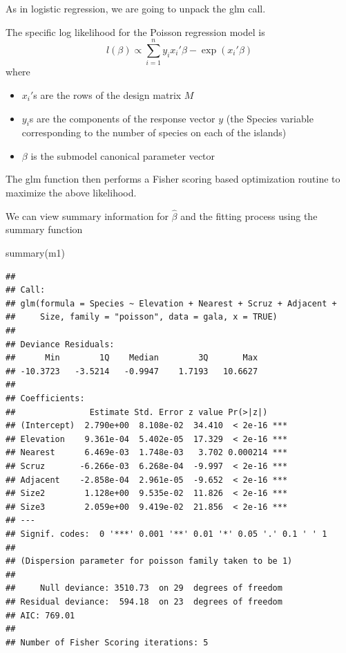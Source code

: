 \documentclass[
  ignorenonframetext,
]{beamer}
\newenvironment{Shaded}{\begin{snugshade}}{\end{snugshade}}
\newcommand{\FunctionTok}[1]{\textcolor[rgb]{0.00,0.00,0.00}{#1}}
\newcommand{\NormalTok}[1]{#1}
\providecommand{\tightlist}{%
  \setlength{\itemsep}{0pt}\setlength{\parskip}{0pt}}
\begin{document}
\begin{frame}{}
\protect\hypertarget{section-4}{}
As in logistic regression, we are going to unpack the glm call.

\vspace{12pt}

The specific log likelihood for the Poisson regression model is \[
  l(\beta) \propto \sum_{i=1}^n y_ix_i'\beta - \exp\left(x_i'\beta\right)
\] where

\begin{itemize}
\tightlist
\item
  \(x_i'\)s are the rows of the design matrix \(M\)
\item
  \(y_i\)s are the components of the response vector \(y\) (the Species
  variable corresponding to the number of species on each of the
  islands)
\item
  \(\beta\) is the submodel canonical parameter vector
\end{itemize}

\vspace{12pt}

The glm function then performs a Fisher scoring based optimization
routine to maximize the above likelihood.
\end{frame}

\begin{frame}[fragile]{}
\protect\hypertarget{section-5}{}
We can view summary information for \(\hat\beta\) and the fitting
process using the summary function

\tiny

\begin{Shaded}
\begin{Highlighting}[]
\FunctionTok{summary}\NormalTok{(m1)}
\end{Highlighting}
\end{Shaded}

\begin{verbatim}
## 
## Call:
## glm(formula = Species ~ Elevation + Nearest + Scruz + Adjacent + 
##     Size, family = "poisson", data = gala, x = TRUE)
## 
## Deviance Residuals: 
##      Min        1Q    Median        3Q       Max  
## -10.3723   -3.5214   -0.9947    1.7193   10.6627  
## 
## Coefficients:
##               Estimate Std. Error z value Pr(>|z|)    
## (Intercept)  2.790e+00  8.108e-02  34.410  < 2e-16 ***
## Elevation    9.361e-04  5.402e-05  17.329  < 2e-16 ***
## Nearest      6.469e-03  1.748e-03   3.702 0.000214 ***
## Scruz       -6.266e-03  6.268e-04  -9.997  < 2e-16 ***
## Adjacent    -2.858e-04  2.961e-05  -9.652  < 2e-16 ***
## Size2        1.128e+00  9.535e-02  11.826  < 2e-16 ***
## Size3        2.059e+00  9.419e-02  21.856  < 2e-16 ***
## ---
## Signif. codes:  0 '***' 0.001 '**' 0.01 '*' 0.05 '.' 0.1 ' ' 1
## 
## (Dispersion parameter for poisson family taken to be 1)
## 
##     Null deviance: 3510.73  on 29  degrees of freedom
## Residual deviance:  594.18  on 23  degrees of freedom
## AIC: 769.01
## 
## Number of Fisher Scoring iterations: 5
\end{verbatim}
\end{frame}
\end{document}
